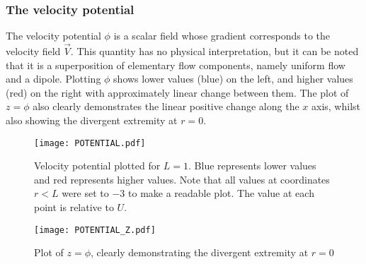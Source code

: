 \subsubsection{The velocity potential}
The velocity potential $\phi$ is a scalar field whose gradient corresponds to the velocity field $\vec{V}$. This quantity has no
physical interpretation, but it can be noted that it is a superposition of elementary flow components, namely uniform flow and a dipole. Plotting $\phi$ shows lower values (blue) on the left, and higher
values (red) on the right with approximately linear change between them. The plot of $z=\phi$
also clearly demonstrates the linear positive change along the $x$ axis, whilst also showing the divergent extremity at $r=0$.
\begin{figure}
	\centering
	\texttt{[image: POTENTIAL.pdf]}
	\caption{Velocity potential plotted for $L=1$. Blue represents lower values and red represents higher values. Note that all values at coordinates $r<L$ were set to $-3$ to make a readable plot. The value at each point is relative to $U$.}
	\label{figure:VELOCITY-POTENTIAL}
\end{figure}
\begin{figure}
	\centering
	\texttt{[image: POTENTIAL\_Z.pdf]}
	\caption{Plot of $z=\phi$, clearly demonstrating the divergent extremity at $r=0$}
	\label{figure:VELOCITY-POTENTIAL-3D}
\end{figure}

